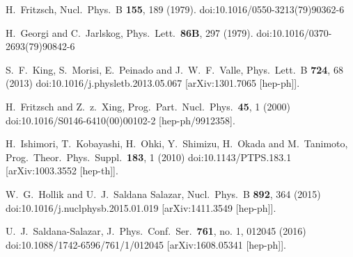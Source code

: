 \documentclass[aps,prd,groupaddress,floatfix,tighten,nofootinbib,showpacs,
amsfonts,superscriptaddress]{revtex4}
\begin{document}
{\begin{thebibliography}{99}
  H.~Fritzsch,
  Nucl.\ Phys.\ B {\bf 155}, 189 (1979).
  doi:10.1016/0550-3213(79)90362-6
  
  H.~Georgi and C.~Jarlskog,
  Phys.\ Lett.\  {\bf 86B}, 297 (1979).
  doi:10.1016/0370-2693(79)90842-6
  
  S.~F.~King, S.~Morisi, E.~Peinado and J.~W.~F.~Valle,
  Phys.\ Lett.\ B {\bf 724}, 68 (2013)
  doi:10.1016/j.physletb.2013.05.067
  [arXiv:1301.7065 [hep-ph]].
  
  H.~Fritzsch and Z.~z.~Xing,
  Prog.\ Part.\ Nucl.\ Phys.\  {\bf 45}, 1 (2000)
  doi:10.1016/S0146-6410(00)00102-2
  [hep-ph/9912358].
  
  H.~Ishimori, T.~Kobayashi, H.~Ohki, Y.~Shimizu, H.~Okada and M.~Tanimoto,
  Prog.\ Theor.\ Phys.\ Suppl.\  {\bf 183}, 1 (2010)
  doi:10.1143/PTPS.183.1
  [arXiv:1003.3552 [hep-th]].
  
  W.~G.~Hollik and U.~J.~Saldana Salazar,
  Nucl.\ Phys.\ B {\bf 892}, 364 (2015)
  doi:10.1016/j.nuclphysb.2015.01.019
  [arXiv:1411.3549 [hep-ph]].
  
  U.~J.~Saldana-Salazar,
  J.\ Phys.\ Conf.\ Ser.\  {\bf 761}, no. 1, 012045 (2016)
  doi:10.1088/1742-6596/761/1/012045
  [arXiv:1608.05341 [hep-ph]].
    

\end{thebibliography}}
\end{document}
